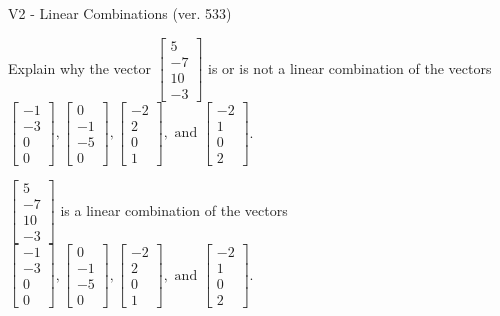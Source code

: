 \begin{exercise}
  \begin{exerciseTitle}V2 - Linear Combinations (ver. 533)\end{exerciseTitle}
  \begin{exerciseStatement}
    Explain why the vector \(\left[\begin{array}{c}
5 \\
-7 \\
10 \\
-3
\end{array}\right]\)  is or is not a linear 
	combination of the vectors \(\left[\begin{array}{c}
-1 \\
-3 \\
0 \\
0
\end{array}\right] , \left[\begin{array}{c}
0 \\
-1 \\
-5 \\
0
\end{array}\right] , \left[\begin{array}{c}
-2 \\
2 \\
0 \\
1
\end{array}\right] , \text{ and } \left[\begin{array}{c}
-2 \\
1 \\
0 \\
2
\end{array}\right]\).
	


  \end{exerciseStatement}
  \begin{exerciseAnswer}
   \(\left[\begin{array}{c}
5 \\
-7 \\
10 \\
-3
\end{array}\right]\) 
  	 is  
	a linear combination of the vectors \(\left[\begin{array}{c}
-1 \\
-3 \\
0 \\
0
\end{array}\right] , \left[\begin{array}{c}
0 \\
-1 \\
-5 \\
0
\end{array}\right] , \left[\begin{array}{c}
-2 \\
2 \\
0 \\
1
\end{array}\right] , \text{ and } \left[\begin{array}{c}
-2 \\
1 \\
0 \\
2
\end{array}\right]\).


\end{exerciseAnswer}
\end{exercise}
